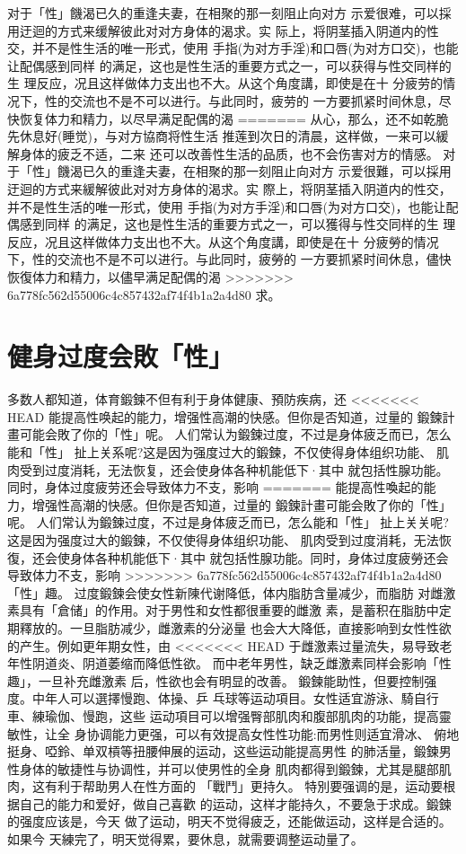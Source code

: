 \documentclass[12pt,UTF8]{ctexbook}
\begin{document}
对于「性」饑渴已久的重逢夫妻，在相聚的那一刻阻止向对方
示爱很难，可以採用迂迴的方式来缓解彼此对对方身体的渴求。实
际上，将阴茎插入阴道内的性交，并不是性生活的唯一形式，使用
手指(为对方手淫)和口唇(为对方口交)，也能让配偶感到同样
的满足，这也是性生活的重要方式之一，可以获得与性交同样的生
理反应，况且这样做体力支出也不大。从这个角度講，即使是在十
分疲劳的情况下，性的交流也不是不可以进行。与此同时，疲劳的
一方要抓紧时间休息，尽快恢复体力和精力，以尽早满足配偶的渴
=======
从心，那么，还不如乾脆先休息好(睡觉)，与对方協商将性生活
推莲到次日的清晨，这样做，一来可以緩解身体的疲乏不适，二来
还可以改善性生活的品质，也不会伤害对方的情感。
对于「性」饑渴已久的重逢夫妻，在相聚的那一刻阻止向对方
示爱很難，可以採用迂迴的方式来緩解彼此对对方身体的渴求。实
際上，将阴茎插入阴道内的性交，并不是性生活的唯一形式，使用
手指(为对方手淫)和口唇(为对方口交)，也能让配偶感到同样
的满足，这也是性生活的重要方式之一，可以獲得与性交同样的生
理反应，况且这样做体力支出也不大。从这个角度講，即使是在十
分疲勞的情况下，性的交流也不是不可以进行。与此同时，疲勞的
一方要抓紧时间休息，儘快恢復体力和精力，以儘早满足配偶的渴
>>>>>>> 6a778fc562d55006c4c857432af74f4b1a2a4d80
求。

\section{健身过度会敗「性」}

多数人都知道，体育鍛鍊不但有利于身体健康、預防疾病，还
<<<<<<< HEAD
能提高性唤起的能力，增强性高潮的快感。但你是否知道，过量的
鍛鍊計畫可能会敗了你的「性」呢。
人们常认为鍛鍊过度，不过是身体疲乏而已，怎么能和「性」
扯上关系呢?这是因为强度过大的鍛鍊，不仅使得身体组织功能、
肌肉受到过度消耗，无法恢复，还会使身体各种机能低下·其中
就包括性腺功能。同时，身体过度疲劳还会导致体力不支，影响
=======
能提高性喚起的能力，增强性高潮的快感。但你是否知道，过量的
鍛鍊計畫可能会敗了你的「性」呢。
人们常认为鍛鍊过度，不过是身体疲乏而已，怎么能和「性」
扯上关关呢?这是因为强度过大的鍛鍊，不仅使得身体组织功能、
肌肉受到过度消耗，无法恢復，还会使身体各种机能低下·其中
就包括性腺功能。同时，身体过度疲勞还会导致体力不支，影响
>>>>>>> 6a778fc562d55006c4c857432af74f4b1a2a4d80
「性」趣。
过度鍛鍊会使女性新陳代谢降低，体内脂肪含量减少，而脂肪
对雌激素具有「倉储」的作用。对于男性和女性都很重要的雌激
素，是蓄积在脂肪中定期釋放的。一旦脂肪减少，雌激素的分泌量
也会大大降低，直接影响到女性性欲的产生。例如更年期女性，由
<<<<<<< HEAD
于雌激素过量流失，易导致老年性阴道炎、阴道萎缩而降低性欲。
而中老年男性，缺乏雌激素同样会影响「性趣」，一旦补充雌激素
后，性欲也会有明显的改善。
鍛鍊能助性，但要控制强度。中年人可以選擇慢跑、体操、乒
乓球等运动項目。女性适宜游泳、騎自行車、練瑜伽、慢跑，这些
运动項目可以增强臀部肌肉和腹部肌肉的功能，提高靈敏性，让全
身协调能力更强，可以有效提高女性性功能:而男性则适宜滑冰、
俯地挺身、啞鈴、单双槓等扭腰伸展的运动，这些运动能提高男性
的肺活量，鍛鍊男性身体的敏捷性与协调性，并可以使男性的全身
肌肉都得到鍛鍊，尤其是腿部肌肉，这有利于帮助男人在性方面的
「戰鬥」更持久。
特別要强调的是，运动要根据自己的能力和爱好，做自己喜歡
的运动，这样才能持久，不要急于求成。鍛鍊的强度应该是，今天
做了运动，明天不觉得疲乏，还能做运动，这样是合适的。如果今
天練完了，明天觉得累，要休息，就需要调整运动量了。
\end{document}
